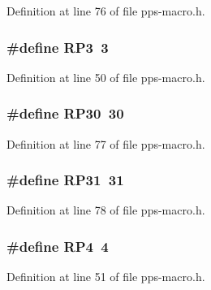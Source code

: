 Definition at line 76 of file pps-\/macro.\+h.

\hypertarget{pps-macro_8h_a433dca12cf35bab54324bb4c980635f7}{}
\subsubsection[{R\+P3}]{\setlength{\rightskip}{0pt plus 5cm}\#define R\+P3~3}\label{pps-macro_8h_a433dca12cf35bab54324bb4c980635f7}


Definition at line 50 of file pps-\/macro.\+h.

\hypertarget{pps-macro_8h_ad45be95f9d36f6d23e31d08ab713ad92}{}
\subsubsection[{R\+P30}]{\setlength{\rightskip}{0pt plus 5cm}\#define R\+P30~30}\label{pps-macro_8h_ad45be95f9d36f6d23e31d08ab713ad92}


Definition at line 77 of file pps-\/macro.\+h.

\hypertarget{pps-macro_8h_a528b8ac86c3cca7ad8c30fb360cfdd67}{}
\subsubsection[{R\+P31}]{\setlength{\rightskip}{0pt plus 5cm}\#define R\+P31~31}\label{pps-macro_8h_a528b8ac86c3cca7ad8c30fb360cfdd67}


Definition at line 78 of file pps-\/macro.\+h.

\hypertarget{pps-macro_8h_a11ceb009a9cc751926c0fa215112a88d}{}
\subsubsection[{R\+P4}]{\setlength{\rightskip}{0pt plus 5cm}\#define R\+P4~4}\label{pps-macro_8h_a11ceb009a9cc751926c0fa215112a88d}


Definition at line 51 of file pps-\/macro.\+h.

\hypertarget{pps-macro_8h_abbc5745deef7e3b20d10bdccc0771dd4}{}
